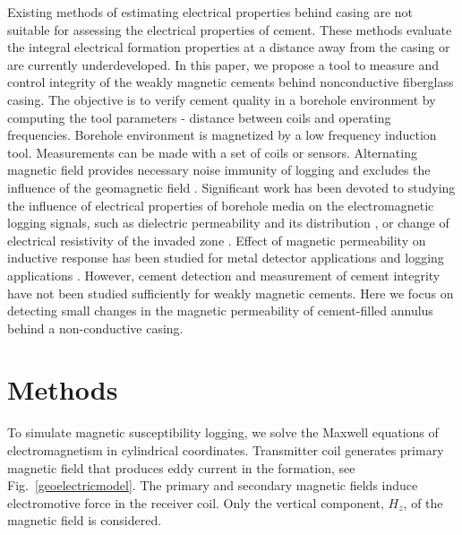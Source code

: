 \documentclass[10pt,twoside]{article}
\begin{document}
Existing methods of estimating electrical properties behind casing are not suitable for assessing the electrical properties of cement. These methods evaluate the integral electrical formation properties at a distance away from the casing or are currently underdeveloped. In this paper, we propose a tool to measure and control integrity of the weakly magnetic cements behind nonconductive fiberglass casing. The objective is to verify cement quality in a borehole environment by computing the tool parameters - distance between coils and operating frequencies.  Borehole environment is magnetized  by a low frequency induction tool. Measurements can be made with a set of coils or sensors. Alternating magnetic field provides necessary noise immunity of logging and excludes the influence of the geomagnetic field \citep{Saraev2004}.  Significant work has been devoted to studying the influence of electrical properties of borehole media on the electromagnetic logging signals, such as dielectric permeability and its distribution \citep{Yeltsov2016}, or change of electrical resistivity of the invaded zone \citep{Eltsov2011}. Effect of magnetic permeability on inductive response has been studied for metal detector applications \citep{Das2006} and logging applications \citep{Barber1995, Hu2009}. However, cement detection and measurement of cement integrity have not been studied sufficiently for weakly magnetic cements. Here we focus on detecting small changes in the magnetic permeability of cement-filled annulus behind a non-conductive casing.


\section{Methods}
\label{Sec:Methods}
To simulate magnetic susceptibility logging, we solve the Maxwell equations of electromagnetism  \citep{Kaufman1965} in cylindrical coordinates. Transmitter coil generates primary magnetic field that produces eddy current in the formation, see Fig.~\ref{geoelectricmodel}. The primary and secondary magnetic fields induce electromotive force in the receiver coil. Only the vertical component, $H_z$, of the magnetic field is considered.
\end{document}
